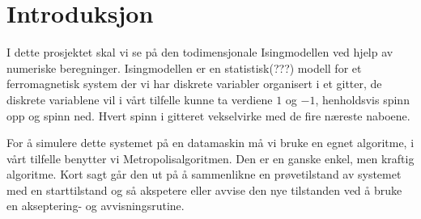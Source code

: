 \documentclass[norsk, 10pt]{article}
\begin{document}
\begin{titlepage}
\begin{center}

\textsf{\Large FYS4150 - Computational Physics\\[0.5cm]
\rule{\linewidth}{0.5mm} \\[0.4cm]
{ \huge \bfseries  PROSJEKT 4}\\[0.10cm]
\rule{\linewidth}{0.5mm} \\[1.5cm]
{\Large Isingmodellen, Monte Carlo og parallellisering}}\\[1.5cm]
\textsc{}\\[1.5cm]


\textsf{\begin{minipage}{0.49\textwidth}
    \begin{center} \large
        Kandidat 72
    \end{center}
\end{minipage}}


\vfill

\textsf{\large{Dato: \today}}

\end{center}
\end{titlepage}

\abstract{}


\section*{Introduksjon}
I dette prosjektet skal vi se på den todimensjonale Isingmodellen ved hjelp av numeriske beregninger. Isingmodellen er en statistisk(???) modell for et ferromagnetisk system der vi har diskrete variabler organisert i et gitter, de diskrete variablene vil i vårt tilfelle kunne ta verdiene $1$ og $-1$, henholdsvis spinn opp og spinn ned. Hvert spinn i gitteret vekselvirke med de fire næreste naboene.

For å simulere dette systemet på en datamaskin må vi bruke en egnet algoritme, i vårt tilfelle benytter vi Metropolisalgoritmen. Den er en ganske enkel, men kraftig algoritme. Kort sagt går den ut på å sammenlikne en prøvetilstand av systemet med en starttilstand og så akspetere eller avvise den nye tilstanden ved å bruke en akseptering- og avvisningsrutine.
\end{document}
